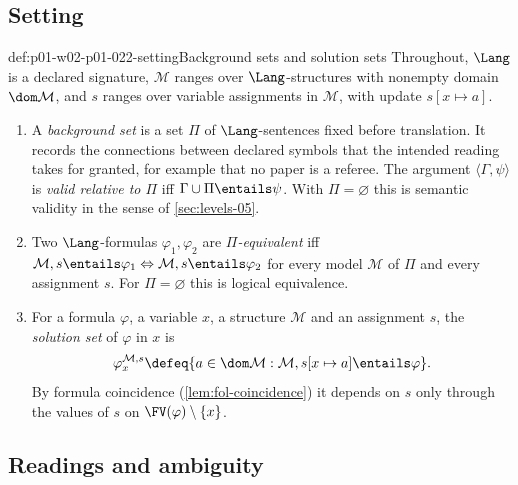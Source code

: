 \subsection{Setting}
\label{sec:p01-w02-p01-022-setting}

\begin{hbconvention}{def:p01-w02-p01-022-setting}{Background sets and solution sets}
Throughout, \(\Lang\) is a declared signature, \(\mathcal M\) ranges over
\(\Lang\)-structures with nonempty domain \(\dom\mathcal M\), and \(s\)
ranges over variable assignments in \(\mathcal M\), with update
\(s[x\mapsto a]\).
\begin{enumerate}
  \item A \emph{background set} is a set \(\Pi\) of \(\Lang\)-sentences fixed
        before translation. It records the connections between declared
        symbols that the intended reading takes for granted, for example
        that no paper is a referee. The argument
        \(\langle\Gamma,\psi\rangle\) is \emph{valid relative to \(\Pi\)}
        iff \(\Gamma\cup\Pi\entails\psi\). With \(\Pi=\varnothing\) this is
        semantic validity in the sense of \cref{sec:levels-05}.
  \item Two \(\Lang\)-formulas \(\varphi_1,\varphi_2\) are
        \emph{\(\Pi\)-equivalent} iff
        \(\mathcal M,s\entails\varphi_1\Leftrightarrow
        \mathcal M,s\entails\varphi_2\) for every model \(\mathcal M\) of
        \(\Pi\) and every assignment \(s\). For \(\Pi=\varnothing\) this is
        logical equivalence.
  \item For a formula \(\varphi\), a variable \(x\), a structure
        \(\mathcal M\) and an assignment \(s\), the \emph{solution set} of
        \(\varphi\) in \(x\) is
        \[
          \varphi^{\mathcal M,s}_x\defeq
          \{a\in\dom\mathcal M:\mathcal M,s[x\mapsto a]\entails\varphi\}.
        \]
        By formula coincidence (\cref{lem:fol-coincidence}) it depends on
        \(s\) only through the values of \(s\) on
        \(\FV(\varphi)\setminus\{x\}\).
\end{enumerate}
\end{hbconvention}

\subsection{Readings and ambiguity}
\label{sec:p01-w02-p01-022-ambiguity}

